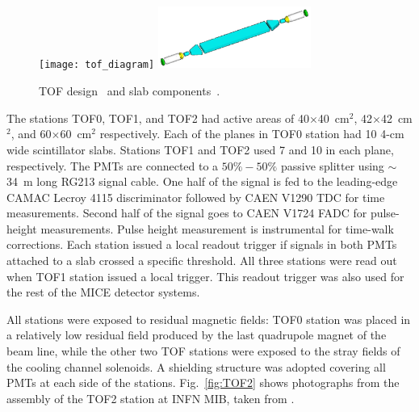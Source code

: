 \begin{figure}[!ht]
  \centering
  \texttt{[image: tof\_diagram]}
  \includegraphics[width=5cm]{slab_design}
  \caption{TOF design~\cite{Rayner:2011zz} and slab components~\cite{NOTE241}.}
  \label{fig:tof:schematic}
\end{figure}

The stations TOF0, TOF1, and TOF2 had active areas of
40$\times$40~cm$^2$, 42$\times$42~cm$^2$, and 60$\times$60~cm$^2$
respectively.  Each of the planes in TOF0 station had 10 4-cm wide
scintillator slabs. Stations TOF1 and TOF2 used 7 and
10 in each plane, respectively.
The PMTs are connected to a $50\%-50\%$ passive splitter using
$\sim$34~m long RG213 signal cable. One half of the signal is fed to
the leading-edge CAMAC Lecroy 4115 discriminator followed by CAEN
V1290 TDC for time measurements. Second half of the signal goes to
CAEN V1724 FADC for pulse-height measurements. Pulse height
measurement is instrumental for time-walk corrections. Each station
issued a local readout trigger if signals in both PMTs attached to a
slab crossed a specific threshold. All three stations were read out when
TOF1 station issued a local trigger. This readout trigger was also
used for the rest of the MICE detector systems.




All stations were exposed to residual magnetic fields: TOF0 station was placed in a relatively low residual field produced by the last quadrupole magnet of the beam line, while the other two TOF stations were exposed to the stray fields of the cooling channel solenoids. A shielding structure was adopted covering all PMTs at each side of the stations. Fig.~\ref{fig:TOF2} shows photographs from the assembly of the TOF2 station at INFN MIB, taken from \cite{NOTE286}.

